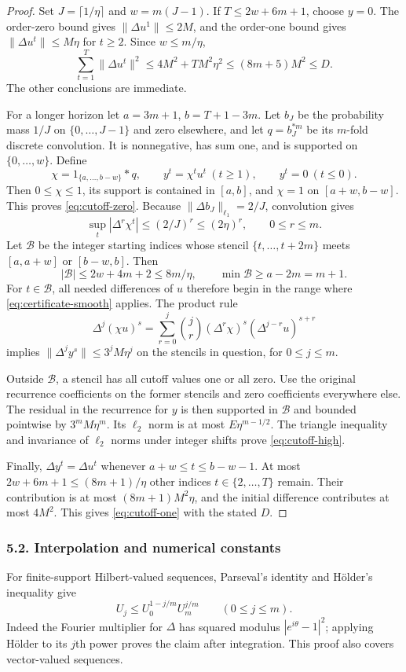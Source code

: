 \documentclass[11pt]{article}
\newcommand{\norm}[1]{\lVert #1\rVert}
\begin{document}
\begin{proof}
Set $J=\lceil1/\eta\rceil$ and $w=m(J-1)$. If
$T\leq2w+6m+1$, choose $y=0$. The order-zero bound gives
$\norm{\Delta u^1}\leq2M$, and the order-one bound gives
$\norm{\Delta u^t}\leq M\eta$ for $t\geq2$. Since $w\leq m/\eta$,
\[
 \sum_{t=1}^T\norm{\Delta u^t}^2
 \leq4M^2+TM^2\eta^2\leq(8m+5)M^2\leq D.
\]
The other conclusions are immediate.

For a longer horizon let $a=3m+1$, $b=T+1-3m$. Let $b_J$ be the
probability mass $1/J$ on $\{0,\ldots,J-1\}$ and zero elsewhere, and let
$q=b_J^{*m}$ be its $m$-fold discrete convolution. It is nonnegative,
has sum one, and is supported on $\{0,\ldots,w\}$. Define
\[
 \chi=1_{\{a,\ldots,b-w\}}*q,\qquad
 y^t=\chi^t u^t\ (t\geq1),\qquad y^t=0\ (t\leq0).
\]
Then $0\leq\chi\leq1$, its support is contained in $[a,b]$, and
$\chi=1$ on $[a+w,b-w]$. This proves \eqref{eq:cutoff-zero}.
Because $\norm{\Delta b_J}_{\ell_1}=2/J$, convolution gives
\[
 \sup_t|\Delta^r\chi^t|\leq(2/J)^r\leq(2\eta)^r,
 \qquad 0\leq r\leq m.
\]
Let $\mathcal B$ be the integer starting indices whose stencil
$\{t,\ldots,t+2m\}$ meets $[a,a+w]$ or $[b-w,b]$.
Then
\[
 |\mathcal B|\leq2w+4m+2\leq8m/\eta,
 \qquad \min\mathcal B\geq a-2m=m+1.
\]
For $t\in\mathcal B$, all needed differences of $u$ therefore begin in
the range where \eqref{eq:certificate-smooth} applies. The product rule
\[
 \Delta^j(\chi u)^s
 =\sum_{r=0}^j\binom jr(\Delta^r\chi)^s
                         (\Delta^{j-r}u)^{s+r}
\]
implies $\norm{\Delta^j y^s}\leq3^jM\eta^j$ on the stencils in
question, for $0\leq j\leq m$.

Outside $\mathcal B$, a stencil has all cutoff values one or all zero.
Use the original recurrence coefficients on the former stencils and zero
coefficients everywhere else. The residual in the recurrence for $y$ is
then supported in $\mathcal B$ and bounded pointwise by $3^mM\eta^m$.
Its $\ell_2$ norm is at most $E\eta^{m-1/2}$. The triangle inequality and
invariance of $\ell_2$ norms under integer shifts prove
\eqref{eq:cutoff-high}.

Finally, $\Delta y^t=\Delta u^t$ whenever
$a+w\leq t\leq b-w-1$. At most $2w+6m+1\leq(8m+1)/\eta$ other
indices $t\in\{2,\ldots,T\}$ remain. Their contribution is at most
$(8m+1)M^2\eta$, and the initial difference contributes at most $4M^2$.
This gives \eqref{eq:cutoff-one} with the stated $D$.
\end{proof}

\subsubsection*{5.2. Interpolation and numerical constants}
For finite-support Hilbert-valued sequences, Parseval's identity and
H\"older's inequality give
\begin{equation}\label{eq:interpolation}
 U_j\leq U_0^{1-j/m}U_m^{j/m}\qquad(0\leq j\leq m).
\end{equation}
Indeed the Fourier multiplier for $\Delta$ has squared modulus
$|e^{i\theta}-1|^2$; applying H\"older to its $j$th power proves the
claim after integration. This proof also covers vector-valued sequences.
\end{document}
